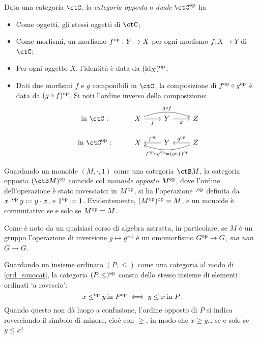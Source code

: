 \begin{definition}\label{def_cat_opp}
	Data una categoria \(\ctC\), la \emph{categoria opposta} o \emph{duale} \(\ctC^\op\) ha
	\begin{itemize}
		\item Come oggetti, gli stessi oggetti di \(\ctC\);
		\item Come morfismi, un morfismo \(f^{\text{op}}:Y\to X\) per ogni morfismo \(f:X\to Y\) di \(\ctC\);
		\item Per ogni oggetto \(X\), l'identità è data da \((\mathrm{id}_X)^{\text{op}}\);
		\item Dati due morfismi \(f\) e \(g\) componibili in \(\ctC\), la composizione di \(f^{\text{op}}\circ g^{\text{op}}\) è data da \((g\circ f)^{\text{op}}\). Si noti l'ordine inverso della composizione:
		      \[
			      \begin{tikzcd}
				      \text{in }\ctC: & X \ar{r}[swap]{f} \ar[bend left=20]{rr}{g\cmp f} & Y \ar{r}[swap]{g} & Z \\
				      \text{in }\ctC^\op: &X & Y  \ar{l}[swap]{f^\op} & Z \ar{l}[swap]{g^\op} \ar[bend left=20]{ll}{f^\op\cmp g^\op=(g\cmp f)^\op}
			      \end{tikzcd}
		      \]
	\end{itemize}
\end{definition}
\begin{example}\label{mon_opposti_cat_opposte}
	Guardando un monoide \((M,\cdot,1)\) come una categoria \(\ctB M\), la categoria opposta \((\ctB M)^\op\) coincide col \emph{monoide opposto} \(M^{\text{op}}\), dove l'ordine dell'operazione è stato rovesciato: in \(M^{\text{op}}\), si ha l'operazione \(\cdot^{\text{op}}\) definita da \(x\cdot^{\text{op}} y \coloneqq y\cdot x\), e \(1^{\text{op}} \coloneqq 1\). Evidentemente, \((M^{\text{op}})^{\text{op}} = M\), e un monoide è commutativo se e solo se \(M^{\text{op}}=M\).

	Come è noto da un qualsiasi corso di algebra astratta, in particolare, se \(M\) è un gruppo l'operazione di inversione \(g\mapsto g^{-1}\) è un omomorfismo \(G^{\text{op}}\to G\), \emph{ma non} \(G\to G\).
\end{example}
\begin{example}
	Guardando un insieme ordinato \((P,\le)\) come una categoria al modo di \ref{ord_sonocat}, la categoria \((P,\le)^{\text{op}}\) consta dello stesso insieme di elementi ordinati `a rovescio':
	\[x\le^{\text{op}} y \, \text{in \(P^{\text{op}}\)}\iff y\le x\, \text{in \(P\)}.\]
	Quando questo non dà luogo a confusione, l'ordine opposto di \(P\) si indica rovesciando il simbolo di minore, cioè con \(\ge\), in modo che \(x\ge y\)\dots{} se e solo se \(y\le x\)!
\end{example}
